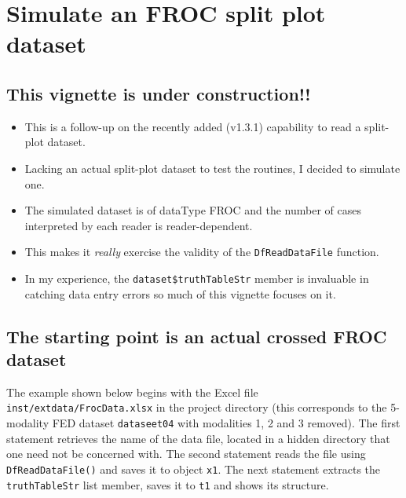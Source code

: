 \documentclass[]{book}
\providecommand{\tightlist}{%
  \setlength{\itemsep}{0pt}\setlength{\parskip}{0pt}}
\begin{document}
\hypertarget{SimufrocSpdataset}{%
\chapter{Simulate an FROC split plot dataset}\label{SimufrocSpdataset}}

\hypertarget{this-vignette-is-under-construction}{%
\section{This vignette is under construction!!}\label{this-vignette-is-under-construction}}

\begin{itemize}
\tightlist
\item
  This is a follow-up on the recently added (v1.3.1) capability to read a split-plot dataset.
\item
  Lacking an actual split-plot dataset to test the routines, I decided to simulate one.
\item
  The simulated dataset is of dataType FROC and the number of cases interpreted by each reader is reader-dependent.
\item
  This makes it \emph{really} exercise the validity of the \texttt{DfReadDataFile} function.
\item
  In my experience, the \texttt{dataset\$truthTableStr} member is invaluable in catching data entry errors so much of this vignette focuses on it.
\end{itemize}

\hypertarget{the-starting-point-is-an-actual-crossed-froc-dataset}{%
\section{The starting point is an actual crossed FROC dataset}\label{the-starting-point-is-an-actual-crossed-froc-dataset}}

The example shown below begins with the Excel file \texttt{inst/extdata/FrocData.xlsx} in the project directory (this corresponds to the 5-modality FED dataset \texttt{dataseet04} \citep{RN1882} with modalities 1, 2 and 3 removed). The first statement retrieves the name of the data file, located in a hidden directory that one need not be concerned with. The second statement reads the file using \texttt{DfReadDataFile()} and saves it to object \texttt{x1}. The next statement extracts the \texttt{truthTableStr} list member, saves it to \texttt{t1} and shows its structure.
\end{document}
